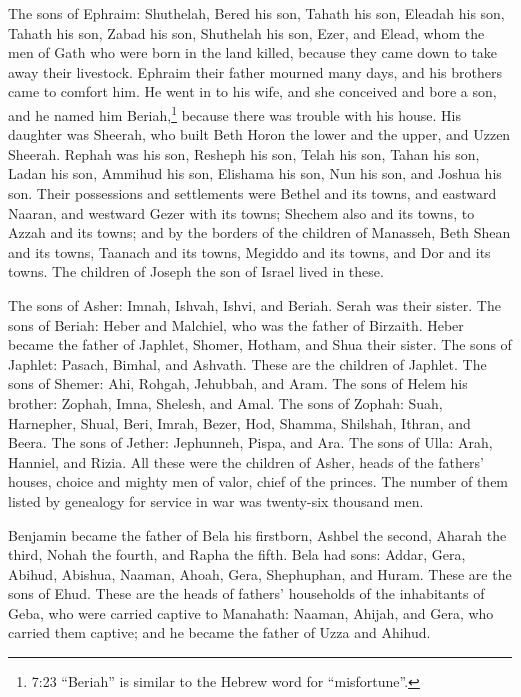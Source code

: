 \myverse{}The sons of Ephraim: Shuthelah, Bered his son, Tahath his son,
Eleadah his son, Tahath his son,
\myverse{}Zabad his son, Shuthelah his son, Ezer, and Elead, whom the men of Gath who
were born in the land killed, because they came down to take away their livestock.
\myverse{}Ephraim their father mourned many days, and his brothers came to comfort him.
\myverse{}He went in to his wife, and she conceived and bore a son, and he named him
Beriah,\footnote{7:23 “Beriah” is similar to the Hebrew word for “misfortune”.} because there was trouble with
his house.
\myverse{}His daughter was Sheerah, who built Beth Horon the lower and the upper, and
Uzzen Sheerah.
\myverse{}Rephah was his son, Resheph his son, Telah his son, Tahan his son,
\myverse{}Ladan his son, Ammihud his son, Elishama his son,
\myverse{}Nun his son, and Joshua his son.
\myverse{}Their possessions and settlements were Bethel and its towns, and eastward
Naaran, and westward Gezer with its towns; Shechem also and its towns, to Azzah and its towns;
\myverse{}and by the borders of the children of Manasseh, Beth Shean and its towns,
Taanach and its towns, Megiddo and its towns, and Dor and its towns. The children of Joseph the son of
Israel lived in these.

\myverse{}The sons of Asher: Imnah, Ishvah, Ishvi, and Beriah. Serah was
their sister.
\myverse{}The sons of Beriah: Heber and Malchiel, who was the father of Birzaith.
\myverse{}Heber became the father of Japhlet, Shomer, Hotham, and Shua their sister.
\myverse{}The sons of Japhlet: Pasach, Bimhal, and Ashvath. These are the children of
Japhlet.
\myverse{}The sons of Shemer: Ahi, Rohgah, Jehubbah, and Aram.
\myverse{}The sons of Helem his brother: Zophah, Imna, Shelesh, and Amal.
\myverse{}The sons of Zophah: Suah, Harnepher, Shual, Beri, Imrah,
\myverse{}Bezer, Hod, Shamma, Shilshah, Ithran, and Beera.
\myverse{}The sons of Jether: Jephunneh, Pispa, and Ara.
\myverse{}The sons of Ulla: Arah, Hanniel, and Rizia.
\myverse{}All these were the children of Asher, heads of the fathers’ houses, choice
and mighty men of valor, chief of the princes. The number of them listed by genealogy for service in war
was twenty-six thousand men.


\mychapter{} \myverse*{}Benjamin became the father of Bela his firstborn, Ashbel the second,
Aharah the third,
\myverse{}Nohah the fourth, and Rapha the fifth.
\myverse{}Bela had sons: Addar, Gera, Abihud,
\myverse{}Abishua, Naaman, Ahoah,
\myverse{}Gera, Shephuphan, and Huram.
\myverse{}These are the sons of Ehud. These are the heads of fathers’ households of the
inhabitants of Geba, who were carried captive to Manahath:
\myverse{}Naaman, Ahijah, and Gera, who carried them captive; and he became the father
of Uzza and Ahihud.

